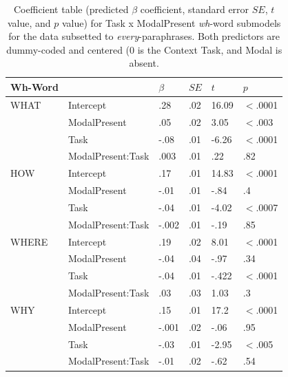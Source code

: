 \documentclass[12pt,letterpaper,table,svgnames,dvipsnames]{article}
\begin{document}
\begin{table}
\begin{center} 
\caption{Coefficient table (predicted $\beta$ coefficient, standard error $SE$, $t$ value, and $p$ value) for Task x ModalPresent \emph{wh}-word submodels for the data subsetted to \emph{every}-paraphrases. Both predictors are dummy-coded and centered (0 is the Context Task, and Modal is absent.} 
\label{sub-models_Task-every} 
\begin{tabular}{llllll} 
\toprule
Wh-Word & {} & $\beta$ & $SE$ & $t$ & $p$\\
\midrule
WHAT & Intercept & .28 & .02 & 16.09 & $<$.0001\\
{} & ModalPresent & .05 & .02 & 3.05 & $<$.003\\
{} & Task & -.08 & .01 & -6.26 & $<$.0001\\
{} & ModalPresent:Task & .003 & .01 & .22 & .82\\
\midrule
HOW & Intercept & .17 & .01 & 14.83 & $<$.0001\\
{} & ModalPresent & -.01 & .01 & -.84 & .4\\
{} & Task & -.04 & .01 & -4.02 & $<$.0007\\
{} & ModalPresent:Task & -.002 & .01 & -.19 & .85\\
\midrule
WHERE & Intercept & .19 & .02 & 8.01 & $<$.0001\\
{} & ModalPresent & -.04 & .04 & -.97 & .34\\
{} & Task & -.04 & .01 & -.422 & $<$.0001\\
{} & ModalPresent:Task & .03 & .03 & 1.03 & .3\\
\midrule
WHY & Intercept & .15 & .01 & 17.2 & $<$.0001\\
{} & ModalPresent & -.001 & .02 & -.06 & .95\\
{} & Task & -.03 & .01 & -2.95 & $<$.005\\
{} & ModalPresent:Task & -.01 & .02 & -.62 & .54\\
\midrule

\end{tabular}
\end{center}
\end{table}
\end{document}
